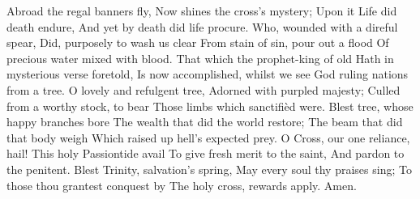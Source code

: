 
Abroad the regal banners fly,
Now shines the cross’s mystery;
Upon it Life did death endure,
And yet by death did life procure.
\vskip 1mm
Who, wounded with a direful spear,
Did, purposely to wash us clear
From stain of sin, pour out a flood
Of precious water mixed with blood.
\vskip 1mm
That which the prophet-king of old
Hath in mysterious verse foretold,
Is now accomplished, whilst we see
God ruling nations from a tree.
\vskip 1mm
O lovely and refulgent tree,
Adorned with purpled majesty;
Culled from a worthy stock, to bear
Those limbs which sanctifièd were.
\vskip 1mm
Blest tree, whose happy branches bore
The wealth that did the world restore;
The beam that did that body weigh
Which raised up hell’s expected prey.
\vskip 1mm
 O Cross, our one reliance, hail!
This holy Passiontide avail
To give fresh merit to the saint,
And pardon to the penitent.
\vskip 1mm
Blest Trinity, salvation’s spring,
May every soul thy praises sing;
To those thou grantest conquest by
The holy cross, rewards apply.
Amen.